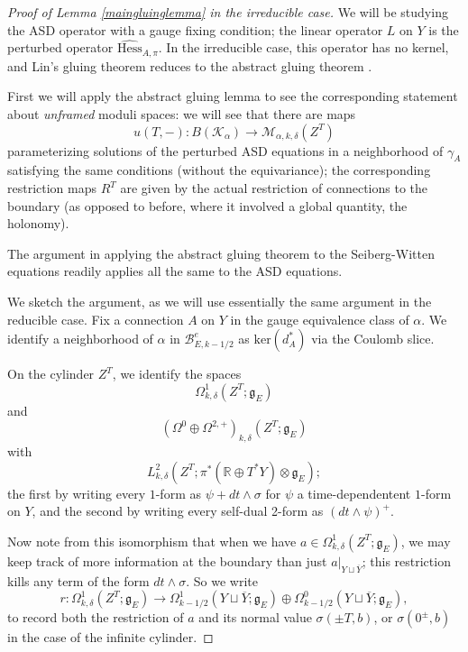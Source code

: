 \documentclass{memo-l}
\theoremstyle{definition}
\theoremstyle{remark}
\numberwithin{section}{chapter}
\numberwithin{equation}{chapter}
\begin{document}
\begin{proof}[Proof of Lemma \ref{maingluinglemma} in the irreducible case]We will be studying the ASD operator with a gauge fixing condition; the linear operator $L$ on $Y$ is the perturbed operator $\widehat{\text{Hess}}_{A, \pi}$. In the irreducible case, this operator has no kernel, and Lin's gluing theorem reduces to the abstract gluing theorem \cite[Theorem~18.3.5]{KMSW}.

First we will apply the abstract gluing lemma to see the corresponding statement about \emph{unframed} moduli spaces: we will see that there are maps
$$u(T, -): B(\mathcal K_\alpha) \to \mathcal M_{\alpha, k,\delta}(Z^T)$$ 
parameterizing solutions of the perturbed ASD equations in a neighborhood of $\gamma_A$ satisfying the same conditions (without the equivariance); the corresponding restriction maps $R^T$ are given by the actual restriction of connections to the boundary (as opposed to before, where it involved a global quantity, the holonomy).

The argument in \cite[Section~18.4]{KMSW} applying the abstract gluing theorem to the Seiberg-Witten equations readily applies all the same to the ASD equations.

We sketch the argument, as we will use essentially the same argument in the reducible case. Fix a connection $A$ on $Y$ in the gauge equivalence class of $\alpha$. We identify a neighborhood of $\alpha$ in $\mathcal B^e_{E,k-1/2}$ as $\text{ker}(d_A^*)$ via the Coulomb slice.

On the cylinder $Z^T$, we identify the spaces $$\Omega^1_{k,\delta}(Z^T;\mathfrak g_E)$$ and $$\left(\Omega^0 \oplus \Omega^{2,+}\right)_{k,\delta}(Z^T;\mathfrak g_E)$$ with $$L^2_{k,\delta}(Z^T;\pi^* \! (\mathbb R \oplus T^*Y) \otimes \mathfrak g_E);$$ the first by writing every $1$-form as $\psi + dt \wedge \sigma$ for $\psi$ a time-dependentent $1$-form on $Y$, and the second by writing every self-dual 2-form as $(dt \wedge \psi)^+$.

Now note from this isomorphism that when we have $a \in \Omega^1_{k,\delta}(Z^T;\mathfrak g_E)$, we may keep track of more information at the boundary than just $a \big|_{Y \sqcup \overline Y}$; this restriction kills any term of the form $dt \wedge \sigma$. So we write $$r: \Omega^1_{k,\delta}(Z^T;\mathfrak g_E) \to \Omega^1_{k-1/2}(Y \sqcup \overline Y; \mathfrak g_E) \oplus \Omega^0_{k-1/2}(Y \sqcup \overline Y; \mathfrak g_E),$$ to record both the restriction of $a$ and its normal value $\sigma(\pm T,b)$, or $\sigma(0^\pm,b)$ in the case of the infinite cylinder.


\end{proof}
\end{document}
